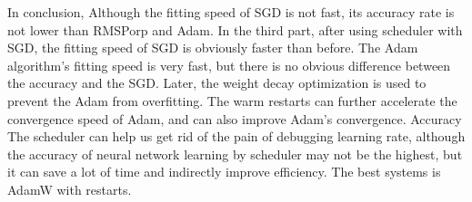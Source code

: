 \documentclass{article}
\begin{document}
In conclusion, Although the fitting speed of SGD is not fast, its accuracy rate is not lower than RMSPorp and Adam. In the third part, after using scheduler with SGD, the fitting speed of SGD is obviously faster than before.
The Adam algorithm's fitting speed is very fast, but there is no obvious difference between the accuracy and the SGD. Later, the weight decay optimization is used to prevent the Adam from overfitting. The warm restarts can further accelerate the convergence speed of Adam, and can also improve Adam's convergence. Accuracy
The scheduler can help us get rid of the pain of debugging learning rate, although the accuracy of neural network learning by scheduler may not be the highest, but it can save a lot of time and indirectly improve efficiency.
The best systems is AdamW with restarts.



\end{document}
